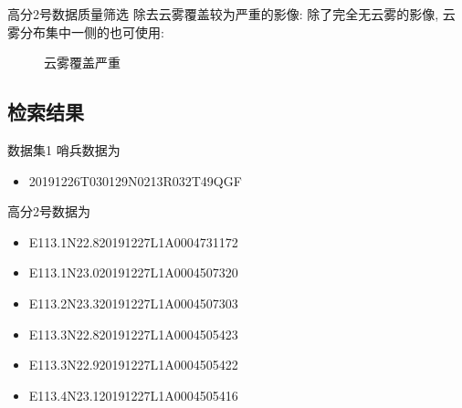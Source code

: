 \begin{frame}{高分2号数据质量筛选}    
    除去云雾覆盖较为严重的影像:
    \small{除了完全无云雾的影像, 云雾分布集中一侧的也可使用}:
    \begin{figure}[!htbp]
        \centering
        \quad
        \caption{云雾覆盖严重}
        \label{fig:0108}
    \end{figure}
\end{frame}

\subsection{检索结果}
\begin{frame}{数据集1}
    \small 哨兵数据为
    
    \begin{itemize}
        \item 20191226T030129N0213R032T49QGF
    \end{itemize}
    \small 高分2号数据为

    \begin{itemize}
        \item E113.1N22.820191227L1A0004731172
        \item E113.1N23.020191227L1A0004507320
        \item E113.2N23.320191227L1A0004507303
        \item E113.3N22.820191227L1A0004505423
        \item E113.3N22.920191227L1A0004505422
        \item E113.4N23.120191227L1A0004505416
    \end{itemize}
\end{frame}


